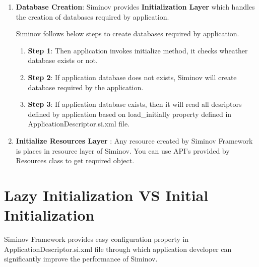 	\begin{enumerate}

		\item \small \textbf{Database Creation}: Siminov provides \textbf{Initialization Layer} which handles the creation of databases required by application. 

		\par
		Siminov follows below steps to create databases required by application.

		\begin{enumerate}

			\item \small \textbf{Step 1}: Then application invokes initialize method, it checks wheather database exists or not.

			\item \small \textbf{Step 2}: If application database does not exists, Siminov will create database required by the application.

			\item \small \textbf{Step 3}: If application database exists, then it will read all desriptors defined by application based on load\_initially property defined in ApplicationDescriptor.si.xml file.

		\end{enumerate}

		
		\item \small \textbf{Initialize Resources Layer}	: Any resource created by Siminov Framework is places in resource layer of Siminov. You can use API's provided by Resources class to get required object.
			
			


	\end{enumerate}



\section{Lazy Initialization VS Initial Initialization}

Siminov Framework provides easy configuration property in ApplicationDescriptor.si.xml file through which application developer can significantly improve the performance of Siminov. 


